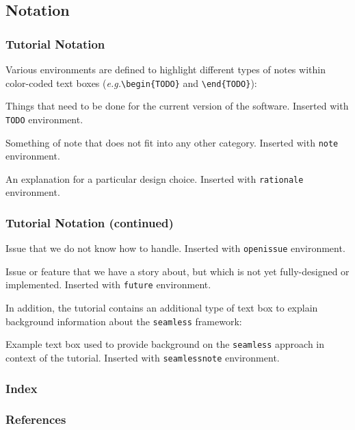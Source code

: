 \documentclass{beamer}
\makeatletter
\newcommand*{\eg}{\emph{e.g.}\@\xspace}
\newcommand*{\seamless}{\texttt{seamless}\@\xspace}
\makeatother
\begin{document}
\subsection{Notation}
\begin{frame}
  \frametitle{Tutorial Notation}
    Various environments are defined to highlight different types of notes within color-coded text boxes 
      (\eg \texttt{\textbackslash begin\{TODO\}}
      and \texttt{\textbackslash end\{TODO\}}):

  \begin{TODO}
    Things that need to be done for the current version of the software. Inserted with \texttt{TODO}
    environment.
  \end{TODO}

  \begin{note-beamer}
    Something of note that does not fit into any other category. Inserted with \texttt{note} environment.
  \end{note-beamer}

  \begin{rationale}
    An explanation for a particular design choice. Inserted with \texttt{rationale} environment.
  \end{rationale}
\end{frame}

\begin{frame}
  \frametitle{Tutorial Notation (continued)}

  \begin{openissue}
    Issue that we do not know how to handle. Inserted with \texttt{openissue} environment.
  \end{openissue}

  \begin{future}
    Issue or feature that we have a story about, but which is not yet
    fully-designed or implemented. Inserted with \texttt{future} environment.
  \end{future}
  In addition, the tutorial contains an additional type of text box to explain background 
  information about the \seamless framework:
  \begin{seamlessnote}
    Example text box used to provide background on the \seamless approach in context of the tutorial. 
    Inserted with \texttt{seamlessnote} environment.
  \end{seamlessnote}
\end{frame}

\begin{frame}
  \frametitle{Index}
  \printindex
\end{frame}

\begin{frame}
  \frametitle{References}
         
   
\end{frame}
\end{document}
